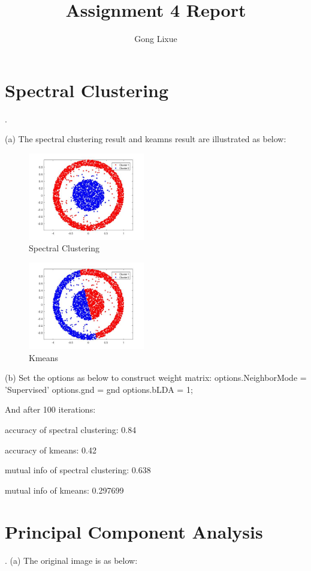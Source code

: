 \documentclass[11pt]{article} %
\title{Assignment 4 Report}
\author{Gong Lixue}
\begin{document}
\maketitle

\section{Spectral Clustering}
.

(a)  The spectral clustering result and keamns result are illustrated as below:
\begin{figure}[h]
\centering
\includegraphics[width=2in]{spectral_cluster.jpg}  %
\caption{Spectral Clustering}
\label{fig1}
\end{figure}

\begin{figure}[h]
\centering
\includegraphics[width=2in]{kmeans.jpg}  %
\caption{Kmeans}
\label{fig1}
\end{figure}

(b) Set the options as below to construct weight matrix:
options.NeighborMode = 'Supervised'
options.gnd = gnd
options.bLDA = 1;

And after 100 iterations:

accuracy of spectral clustering: 0.84

accuracy of kmeans: 0.42

mutual info of spectral clustering: 0.638

mutual info of kmeans: 0.297699

\section{Principal Component Analysis}
.
(a)  The original image is as below:
\end{document}
